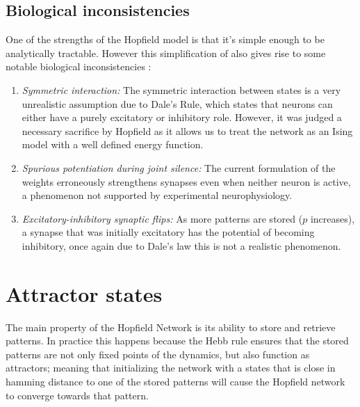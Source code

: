 \documentclass[a4paper,12pt]{report}
\begin{document}
\subsection*{Biological inconsistencies}
One of the strengths of the Hopfield model is that it's simple enough to be 
analytically tractable. However this simplification of also gives rise to some 
notable biological inconsistencies \cite{Hertz2018}:
\begin{enumerate}
    \item\emph{Symmetric interaction:}  The symmetric interaction between states is a 
    very unrealistic assumption due to Dale's Rule, which states that neurons can 
    either have a purely excitatory or inhibitory role. However, it was judged a 
    necessary sacrifice by Hopfield as it allows us to treat the network as an 
    Ising model with a well defined energy function.
    \item \emph{Spurious potentiation during joint silence:}  The current formulation 
    of the weights erroneously strengthens synapses even when neither neuron is active, 
    a phenomenon not supported by experimental neurophysiology.
    \item \emph{Excitatory-inhibitory synaptic flips:}  As more patterns are 
    stored (\(p\) increases), a synapse that was initially excitatory has the 
    potential of becoming inhibitory, once again due to Dale's law this is not a 
    realistic phenomenon.
\end{enumerate}

\section{Attractor states}
The main property of the Hopfield Network is its ability to store and retrieve 
patterns. In practice this happens because the Hebb rule ensures that the stored 
patterns are not only fixed points of the dynamics, but also function as attractors; 
meaning that initializing the network with a states that is close in hamming 
distance to one of the stored patterns will cause the Hopfield network to converge 
towards that pattern.
\end{document}
